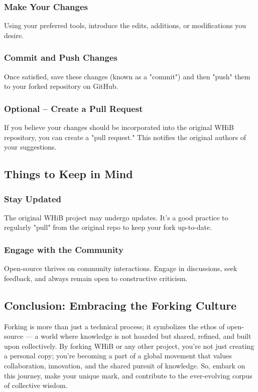 \documentclass[a4paper,12pt]{book}
\begin{document}
\subsubsection*{Make Your Changes}
Using your preferred tools, introduce the edits, additions, or modifications you desire.

\subsubsection*{Commit and Push Changes}
Once satisfied, save these changes (known as a "commit") and then "push" them to your forked repository on GitHub.

\subsubsection*{Optional – Create a Pull Request}
If you believe your changes should be incorporated into the original WHiB repository, you can create a "pull request." This notifies the original authors of your suggestions.

\subsection*{Things to Keep in Mind}
\subsubsection*{Stay Updated}
The original WHiB project may undergo updates. It's a good practice to regularly "pull" from the original repo to keep your fork up-to-date.

\subsubsection*{Engage with the Community}
Open-source thrives on community interactions. Engage in discussions, seek feedback, and always remain open to constructive criticism.

\subsection*{Conclusion: Embracing the Forking Culture}
Forking is more than just a technical process; it symbolizes the ethos of open-source — a world where knowledge is not hoarded but shared, refined, and built upon collectively. By forking WHiB or any other project, you're not just creating a personal copy; you're becoming a part of a global movement that values collaboration, innovation, and the shared pursuit of knowledge. So, embark on this journey, make your unique mark, and contribute to the ever-evolving corpus of collective wisdom.
\end{document}
